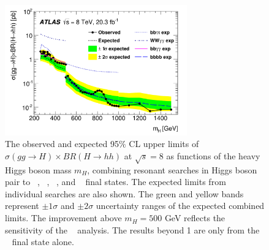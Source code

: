\begin{figure}[h!]
  \centering
  \includegraphics[width=0.7\textwidth]{figures/theory/Run1_ATLAS}
  \caption{The observed and expected 95$\%$ CL upper limits of $\sigma(gg \to H) \times BR(H \to hh)$ at $\sqrt{s}=8$ \TeV as functions of the heavy Higgs boson mass $m_{H}$, combining resonant searches in Higgs boson pair to \bbtautau~, \WWgg~, \bbgg~, and \bbbb~ final states. The expected limits from individual searches are also shown. The green and yellow bands represent $\pm 1\sigma$ and $\pm 2\sigma$ uncertainty ranges of the expected combined limits. The improvement above $m_{H} =500$ GeV reflects the sensitivity of the \bbbb~ analysis. The results beyond 1 \TeV are only from the \bbbb~ final state alone.}
  \label{fig:Run1_ATLAS}
\end{figure}

